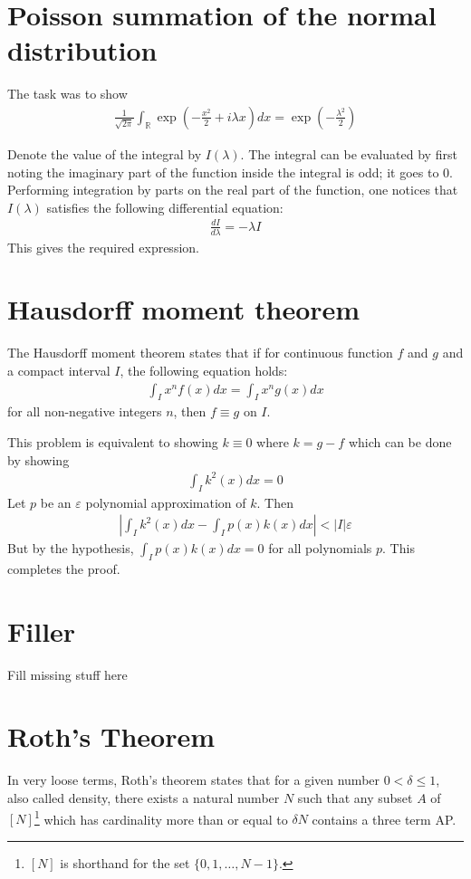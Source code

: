 \documentclass{article}
\theoremstyle{definition}
\begin{document}
\section{Poisson summation of the normal distribution}
The task was to show
\begin{align*}
    \frac{1}{\sqrt{2\pi}} \int_{\mathbb{R}} \exp\left(-\frac{x^2}{2} + i\lambda x\right) dx = \exp\left( -\frac{\lambda^2}{2} \right)
\end{align*}

Denote the value of the integral by $I(\lambda)$. The integral can be evaluated by first noting the imaginary part of the function inside the integral is odd; it goes to $0$. Performing integration by parts on the real part of the function, one notices that $I(\lambda)$ satisfies the following differential equation:
\begin{align*}
    \frac{dI}{d\lambda} = -\lambda I
\end{align*}
This gives the required expression.

\section{Hausdorff moment theorem}
The Hausdorff moment theorem states that if for continuous function $f$ and $g$ and a compact interval $I$, the following equation holds:
\begin{align*}
    \int_{I}x^nf(x) dx = \int_{I}x^ng(x) dx
\end{align*}
for all non-negative integers $n$, then $f \equiv g$ on $I$.

This problem is equivalent to showing $k \equiv 0$ where $k =g-f$ which can be done by showing
\begin{align*}
    \int_{I}k^2(x) dx = 0
\end{align*}
Let $p$ be an $\varepsilon$ polynomial approximation of $k$. Then
\begin{align*}
    \left|\int_{I}k^2(x) dx - \int_{I}p(x) k(x) dx \right| < |I|\varepsilon
\end{align*}
But by the hypothesis, $\displaystyle \int_{I}p(x)k(x) dx = 0$ for all polynomials $p$. This completes the proof.

\section{Filler}
Fill missing stuff here

\section{Roth's Theorem}
In very loose terms, Roth's theorem states that for a given number $0 <\delta \leq 1$, also called density, there exists a natural number $N$ such that any subset $A$ of $[N]$\footnote{$[N]$ is shorthand for the set $\{0, 1, \ldots, N-1\}$.} which has cardinality more than or equal to $\delta N$ contains a three term AP.
\end{document}
